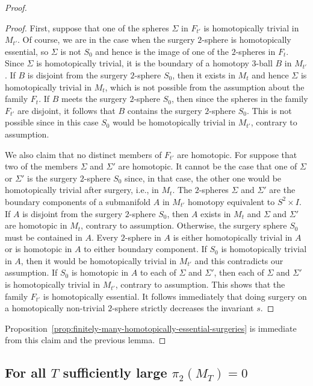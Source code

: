 \begin{proof}
\begin{proof}
First, suppose that one of the spheres $\Sigma$ in $F_{t'}$ is
homotopically trivial in $M_{t'}$. Of course, we are in the case
when the surgery $2$-sphere is homotopically essential, so $\Sigma$
is not $S_0$ and hence is the image of one of the $2$-spheres in
$F_t$. Since $\Sigma$ is homotopically trivial, it is the boundary
of a homotopy $3$-ball $B$ in $M_{t'}$. If $B$ is disjoint from the
surgery $2$-sphere $S_0$, then it exists in $M_t$ and hence $\Sigma$
is homotopically trivial in $M_t$, which is not possible from the
assumption about the family $F_t$. If $B$ meets the surgery
$2$-sphere $S_0$, then since the spheres in the family $F_{t'}$ are
disjoint, it follows that $B$ contains the surgery $2$-sphere $S_0$.
This is not possible since in this case $S_0$ would be homotopically
trivial in $M_{t'}$, contrary to assumption.

We also claim that no distinct members of $F_{t'}$ are homotopic.
For suppose that two of the members $\Sigma$ and $\Sigma'$ are
homotopic. It cannot be the case that one of $\Sigma$ or $\Sigma'$
is the surgery $2$-sphere $S_0$ since, in that case, the other one
would be homotopically trivial after surgery, i.e., in $M_t$. The
$2$-spheres $\Sigma$ and $\Sigma'$ are the boundary components of a
submanifold  $A$ in $M_{t'}$ homotopy equivalent to $S^2\times I$.
If $A$ is disjoint from the surgery $2$-sphere $S_0$, then $A$
exists in $M_t$ and $\Sigma$ and $\Sigma'$ are homotopic in $M_{t}$,
contrary to assumption. Otherwise, the surgery sphere $S_0$ must be
contained in $A$. Every $2$-sphere in $A$ is either homotopically
trivial in $A$ or is homotopic in $A$ to either boundary component.
If $S_0$ is homotopically trivial in $A$, then it would be
homotopically trivial in $M_{t'}$ and this contradicts our
assumption. If $S_0$ is homotopic in $A$ to each of $\Sigma$ and
$\Sigma'$, then each of $\Sigma$ and $\Sigma'$ is homotopically
trivial in $M_{t'}$, contrary to assumption. This shows that the
family $F_{t'}$ is homotopically essential. It follows immediately
that doing surgery on a homotopically non-trivial $2$-sphere
strictly decreases the invariant $s$.
\end{proof}


Proposition~\ref{prop:finitely-many-homotopically-essential-surgeries} is immediate from this claim and the
previous lemma.
\end{proof}


\subsection{For all $T$ sufficiently large $\pi_2(M_T)=0$}


